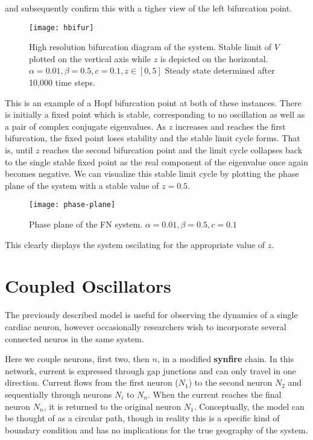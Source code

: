 \documentclass[11pt]{report}
\begin{document}
and subsequently confirm this with a tigher view of the left bifurcation point.

\begin{figure}[!ht]
  \caption{High resolution bifurcation diagram of the system. Stable limit of $V$ plotted on the vertical axis while $z$ is depicted on the horizontal. $\alpha = 0.01, \beta = 0.5,c = 0.1,z \in [0,5]$ Steady state determined after 10,000 time steps. }
  \centering
    \texttt{[image: hbifur]}
\end{figure}


This is an example of a Hopf bifurcation point at both of these instances. There is initially a fixed point which is stable, corresponding to no oscillation as well as a pair of complex conjugate eigenvalues. As $z$ increases and reaches the first bifurcation, the fixed point loses stability and the stable limit cycle forms. That is, until $z$ reaches the second bifurcation point and the limit cycle collapses back to the single stable fixed point as the real component of the eigenvalue once again becomes negative. We can visualize this stable limit cycle by plotting the phase plane of the system with a stable value of $z = 0.5$.

\begin{figure}[!ht]
  \caption{Phase plane of the FN system. $\alpha = 0.01, \beta = 0.5,c = 0.1$ }
  \centering
    \texttt{[image: phase-plane]}
\end{figure}

This clearly displays the system oscilating for the appropriate value of $z$.

\section{Coupled Oscillators} %
\label{sub:coupled_oscillators}

The previously described model is useful for observing the dynamics of a single cardiac neuron, however occasionally researchers wish to incorporate several connected neuros in the same system. 

Here we couple neurons, first two, then $n$, in a modified \textbf{synfire} chain. In this network, current is expressed through gap junctions and can only travel in one direction. Current flows from the first neuron ($N_1$) to the second neuron $N_2$ and sequentially through neurons $N_i$ to $N_n$. When the current reaches the final neuron $N_n$, it is returned to the original neuron $N_1$. Conceptually, the model can be thought of as a circular path, though in reality this is a specific kind of boundary condition and has no implications for the true geography of the system. 
\end{document}
